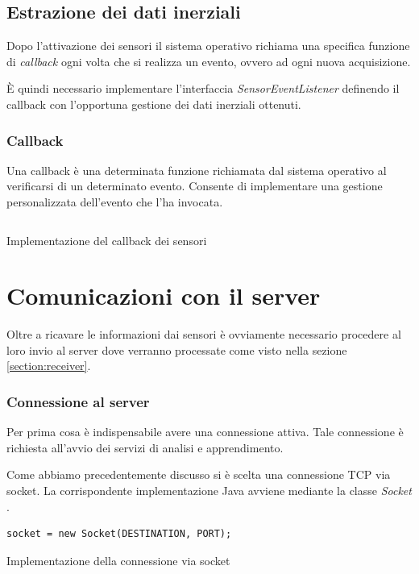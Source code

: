 \subsection{Estrazione dei dati inerziali}
Dopo l'attivazione dei sensori il sistema operativo richiama una specifica funzione di \textit{callback} ogni volta 
che si realizza un evento, ovvero ad ogni nuova acquisizione.

È quindi necessario implementare l'interfaccia \textit{SensorEventListener} \cite{sensor_listener} definendo il 
callback con l'opportuna gestione dei dati inerziali ottenuti.

\subsubsection{Callback}
Una callback è una determinata funzione richiamata dal sistema operativo al verificarsi di un determinato evento.
Consente di implementare una gestione personalizzata dell'evento che l'ha invocata.

\begin{listing}[H] 
    \inputminted[frame=single,framesep=10pt]{java}{assets/snippets/app/sensors.java}
    \caption{Implementazione del callback dei sensori}
    \label{listing:sensor-event-callback}
\end{listing}

\newpage
\section{Comunicazioni con il server}
Oltre a ricavare le informazioni dai sensori è ovviamente necessario procedere al loro invio al server  
dove verranno processate come visto nella sezione \ref{section:receiver}.
\subsubsection{Connessione al server}
Per prima cosa è indispensabile avere una connessione attiva. Tale connessione è richiesta all'avvio dei servizi di 
analisi e apprendimento.

Come abbiamo precedentemente discusso si è scelta una connessione TCP via socket. La corrispondente implementazione Java
avviene mediante la classe \textit{Socket} \cite{socket}.
\begin{listing}[H] 
    \begin{verbatim}
socket = new Socket(DESTINATION, PORT);
    \end{verbatim}
    \caption{Implementazione della connessione via socket}
\end{listing}


